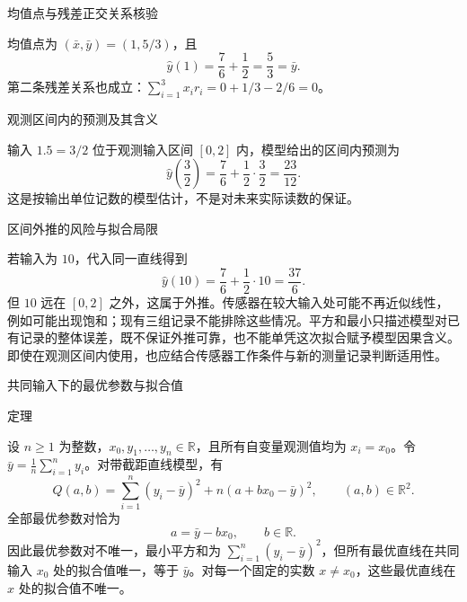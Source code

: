 \documentclass[aspectratio=169,10pt,fontset=fandol]{ctexbeamer}
\begin{document}
\begin{frame}[t,fragile]{均值点与残差正交关系核验}
\footnotesize
{\footnotesize
均值点为 $(\bar{x},\bar{y})=(1,5/3)$，且
\[
\hat{y}(1)=\frac76+\frac12=\frac53=\bar{y}.
\]
第二条残差关系也成立：$\sum_{i=1}^{3}x_i r_i=0+1/3-2/6=0$。


}
\end{frame}
\begin{frame}[t,fragile]{观测区间内的预测及其含义}
\footnotesize
{\footnotesize
输入 $1.5=3/2$ 位于观测输入区间 $[0,2]$ 内，模型给出的区间内预测为
\[
\hat{y}\left(\frac32\right)=\frac76+\frac12\cdot\frac32
=\frac{23}{12}.
\]
这是按输出单位记数的模型估计，不是对未来实际读数的保证。


}
\end{frame}
\begin{frame}[t,fragile]{区间外推的风险与拟合局限}
\footnotesize
{\footnotesize
若输入为 $10$，代入同一直线得到
\[
\hat{y}(10)=\frac76+\frac12\cdot10=\frac{37}{6}.
\]
但 $10$ 远在 $[0,2]$ 之外，这属于外推。传感器在较大输入处可能不再近似线性，例如可能出现饱和；现有三组记录不能排除这些情况。平方和最小只描述模型对已有记录的整体误差，既不保证外推可靠，也不能单凭这次拟合赋予模型因果含义。即使在观测区间内使用，也应结合传感器工作条件与新的测量记录判断适用性。\par

}
\end{frame}
\begin{frame}[t,fragile]{共同输入下的最优参数与拟合值}
\footnotesize
\begin{block}{定理}
{\footnotesize
设 $n\geq1$ 为整数，$x_0,y_1,\ldots,y_n\in\mathbb{R}$，且所有自变量观测值均为 $x_i=x_0$。令 $\bar{y}=\frac1n\sum_{i=1}^{n}y_i$。对带截距直线模型，有
\[
Q(a,b)=\sum_{i=1}^{n}(y_i-\bar{y})^2+n(a+bx_0-\bar{y})^2,
\qquad (a,b)\in\mathbb{R}^2.
\]
全部最优参数对恰为
\[
a=\bar{y}-bx_0,\qquad b\in\mathbb{R}.
\]
因此最优参数对不唯一，最小平方和为 $\sum_{i=1}^{n}(y_i-\bar{y})^2$，但所有最优直线在共同输入 $x_0$ 处的拟合值唯一，等于 $\bar{y}$。对每一个固定的实数 $x\ne x_0$，这些最优直线在 $x$ 处的拟合值不唯一。

}
\end{block}
\end{frame}
\end{document}
